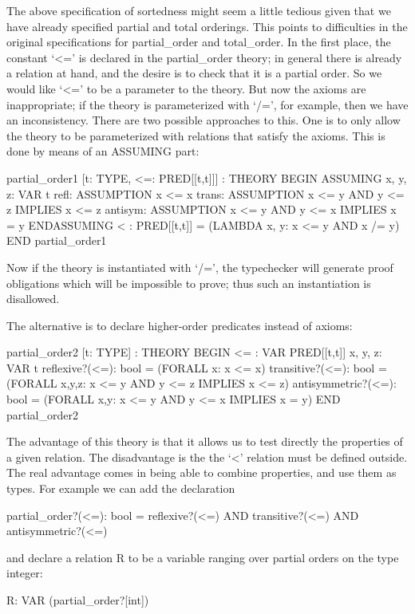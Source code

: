 The above specification of sortedness might seem a little tedious given
that we have already specified partial and total orderings.  This points
to difficulties in the original specifications for {\stt partial\_order}
and {\stt total\_order}.  In the first place, the constant `{\stt <=}'
is declared in the {\stt partial\_order} theory; in general there is
already a relation at hand, and the desire is to check that it is a
partial order.  So we would like `{\stt <=}' to be a parameter to the
theory.  But now the axioms are inappropriate; if the theory is
parameterized with `{\stt /=}', for example, then we have an
inconsistency.  There are two possible approaches to this.  One is to
only allow the theory to be parameterized with relations that satisfy
the axioms.  This is done by means of an {\stt ASSUMING} part:
\begin{pvsexample}
  partial_order1 [t: TYPE, <=: PRED[[t,t]]] : THEORY
   BEGIN
    ASSUMING
     x, y, z: VAR t
     refl: ASSUMPTION x <= x
     trans: ASSUMPTION  x <= y AND y <= z IMPLIES x <= z
     antisym: ASSUMPTION x <= y AND y <= x IMPLIES x = y
    ENDASSUMING
    < : PRED[[t,t]] = (LAMBDA x, y: x <= y AND x /= y)
   END partial_order1
\end{pvsexample}
%
Now if the theory is instantiated with `{\stt /=}', the typechecker will
generate proof obligations which will be impossible to prove; thus such
an instantiation is disallowed.

The alternative is to declare higher-order predicates instead of axioms:
\begin{pvsexample}
  partial_order2 [t: TYPE] : THEORY
   BEGIN
    <= : VAR PRED[[t,t]]
    x, y, z: VAR t
    reflexive?(<=): bool = (FORALL x: x <= x)
    transitive?(<=): bool =
      (FORALL x,y,z: x <= y AND y <= z IMPLIES x <= z)
    antisymmetric?(<=): bool =
      (FORALL x,y: x <= y AND y <= x IMPLIES x = y)
   END partial_order2
\end{pvsexample}
%
The advantage of this theory is that it allows us to test directly the
properties of a given relation.  The disadvantage is the the `{\stt <}'
relation must be defined outside.  The real advantage comes in being
able to combine properties, and use them as types. For example we can
add the declaration
\begin{pvsexample}
  partial_order?(<=): bool =
    reflexive?(<=) AND transitive?(<=) AND antisymmetric?(<=)
\end{pvsexample}
%
and declare a relation {\stt R} to be a variable ranging over partial
orders on the type integer:
\begin{pvsexample}
  R: VAR (partial_order?[int])
\end{pvsexample}

